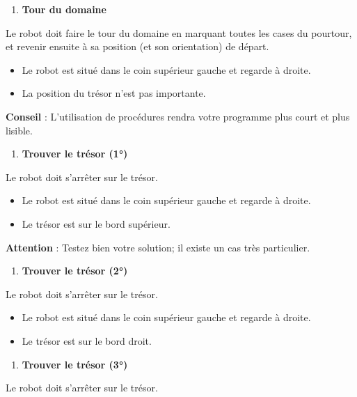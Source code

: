 \liststyleExercice
\setcounter{saveenum}{\value{enumi}}
\begin{enumerate}
\setcounter{enumi}{\value{saveenum}}
\item {\sffamily\bfseries
Tour du domaine}
\end{enumerate}
{
Le robot doit faire le tour du domaine en marquant toutes les cases du
pourtour, et revenir ensuite à sa position (et son orientation) de
départ.}

\liststyleListi
\begin{itemize}
\item {
Le robot est situé dans le coin supérieur gauche et regarde à droite.}
\item {
La position du trésor n'est pas importante.}
\end{itemize}
{
\textbf{Conseil} : L'utilisation de procédures rendra
votre programme plus court et plus lisible.}

\liststyleExercice
\begin{enumerate}
\item {\sffamily\bfseries
Trouver le trésor (1°)}
\end{enumerate}
{
Le robot doit s'arrêter sur le trésor.}

\liststyleListi
\begin{itemize}
\item {
Le robot est situé dans le coin supérieur gauche et regarde à droite.}
\item {
Le trésor est sur le bord supérieur.}
\end{itemize}
{
\textbf{Attention} : Testez bien votre solution; il existe un cas très
particulier.}

\liststyleExercice
\begin{enumerate}
\item {\sffamily\bfseries
Trouver le trésor (2°)}
\end{enumerate}
{
Le robot doit s'arrêter sur le trésor.}

\liststyleListi
\begin{itemize}
\item {
Le robot est situé dans le coin supérieur gauche et regarde à droite.}
\item {
Le trésor est sur le bord droit.}
\end{itemize}
\liststyleExercice
\begin{enumerate}
\item {\sffamily\bfseries
Trouver le trésor (3°)}
\end{enumerate}
{
Le robot doit s'arrêter sur le trésor.}

